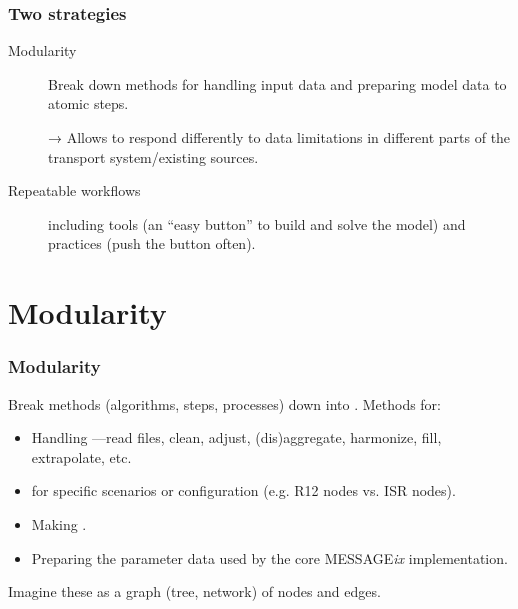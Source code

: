 \documentclass[12pt,aspectratio=169]{beamer}
\begin{document}
\begin{frame}
\frametitle{Two strategies}

\large

\begin{description}
  \item [Modularity] Break down methods for handling input data and preparing model data to atomic steps.

  → Allows to respond differently to data limitations in different parts of the transport system/existing sources.
  \item [Repeatable workflows] including tools (an “easy button” to build and solve the model) and practices (push the button often).
\end{description}
\end{frame}

\section{Modularity}

\begin{frame}
\frametitle{Modularity}

Break methods (algorithms, steps, processes) down into .
Methods for:
\begin{itemize}
  \item Handling —read files, clean, adjust, (dis)aggregate, harmonize, fill, extrapolate, etc.
  \item {} for specific scenarios or configuration (e.g. R12 nodes vs. ISR nodes).
  \item Making .
  \item Preparing the parameter data used by the core MESSAGE\emph{ix} implementation.
\end{itemize}

\bigskip
Imagine these as a graph (tree, network) of nodes and edges.
\end{frame}
\end{document}
